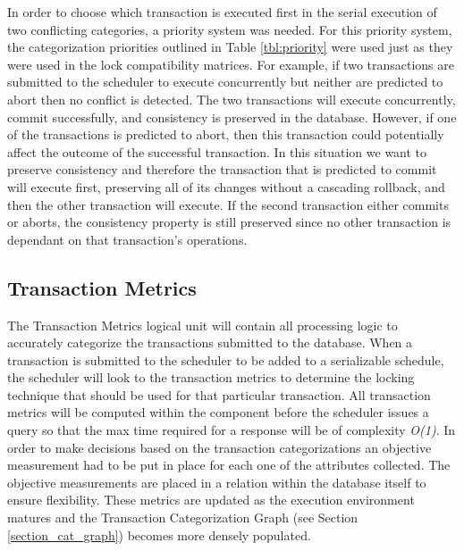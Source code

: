\documentclass[conference]{IEEEtran}
\begin{document}
In order to choose which transaction is executed first in the serial execution of two conflicting categories, a priority system was needed. For this priority system, the categorization priorities outlined in Table \ref{tbl:priority} were used just as they were used in the lock compatibility matrices. For example, if two transactions are submitted to the scheduler to execute concurrently but neither are predicted to abort then no conflict is detected. The two transactions will execute concurrently, commit successfully, and consistency is preserved in the database. However, if one of the transactions is predicted to abort, then this transaction could potentially affect the outcome of the successful transaction. In this situation we want to preserve consistency and therefore the transaction that is predicted to commit will execute first, preserving all of its changes without a cascading rollback, and then the other transaction will execute. If the second transaction either commits or aborts, the consistency property is still preserved since no other transaction is dependant on that transaction's operations.

\subsection{Transaction Metrics}

The Transaction Metrics logical unit will contain all processing logic to accurately categorize the transactions submitted to the database. When a transaction is submitted to the scheduler to be added to a serializable schedule, the scheduler will look to the transaction metrics to determine the locking technique that should be used for that particular transaction. All transaction metrics will be computed within the component before the scheduler issues a query so that the max time required for a response will be of complexity \textit{O(1)}. In order to make decisions based on the transaction categorizations an objective measurement had to be put in place for each one of the attributes collected. The objective measurements are placed in a relation within the database itself to ensure flexibility. These metrics are updated as the execution environment matures and the Transaction Categorization Graph (see Section \ref{section_cat_graph}) becomes more densely populated. 
\end{document}
